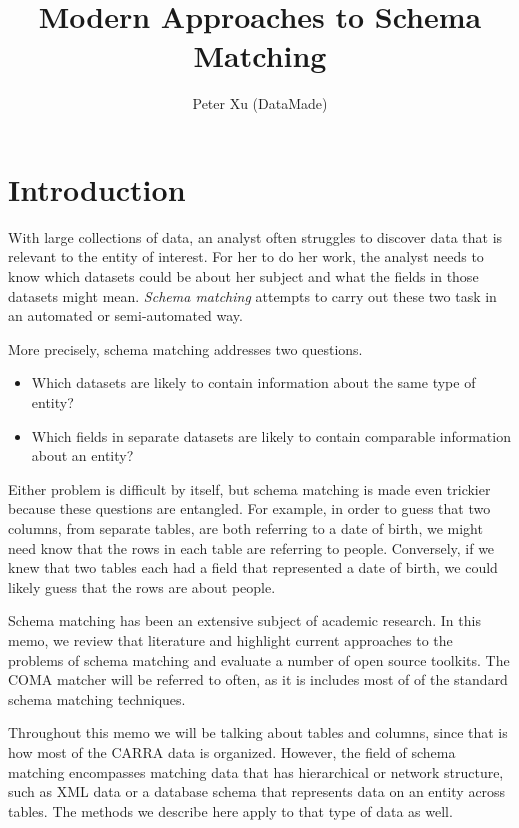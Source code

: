\documentclass{datamade}
\title{Modern Approaches to Schema Matching}
\author{Peter Xu (DataMade)}
\theoremstyle{definition}
\theoremstyle{remark}
\begin{document}
	\maketitle
	
\section*{Introduction}

With large collections of data, an analyst often struggles to discover
data that is relevant to the entity of interest. For her to do her
work, the analyst needs to know which datasets could be about her
subject and what the fields in those datasets might mean. \emph{Schema
  matching} attempts to carry out these two task in an automated or
semi-automated way.

More precisely, schema matching addresses two questions.

\begin{itemize}
  \item Which datasets are likely to contain information about the
    same type of entity?
  \item Which fields in separate datasets are likely to contain comparable
    information about an entity?
\end{itemize}

Either problem is difficult by itself, but schema matching is made
even trickier because these questions are entangled. For example, in
order to guess that two columns, from separate tables, are both
referring to a date of birth, we might need know that the rows in each
table are referring to people. Conversely, if we knew that two tables
each had a field that represented a date of birth, we could likely
guess that the rows are about people.

Schema matching has been an extensive subject of academic research.
In this memo, we review that literature and highlight current
approaches to the problems of schema matching and evaluate a number of
open source toolkits. The COMA matcher \cite{coma} will be referred to
often, as it is includes most of of the standard schema matching
techniques.

Throughout this memo we will be talking about tables and columns,
since that is how most of the CARRA data is organized. However, the
field of schema matching encompasses matching data that has
hierarchical or network structure, such as XML data or a database
schema that represents data on an entity across tables. The methods we
describe here apply to that type of data as well.
\end{document}

